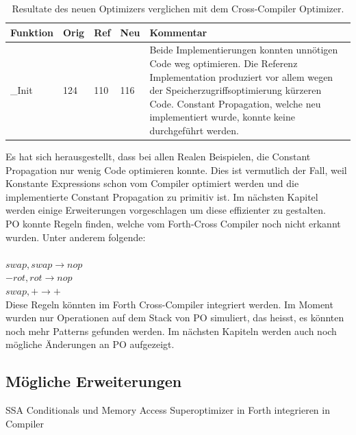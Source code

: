\begin{table}[H]
\begin{center}
    \begin{tabular}{ | l | l | l | l | p{8cm} |}
    \hline
    \textbf{Funktion} & \textbf{Orig} & \textbf{Ref} & \textbf{Neu} & \textbf{Kommentar} \\ \hline
    \_Init & 124 & 110 & 116 & Beide Implementierungen konnten unnötigen Code weg optimieren. Die Referenz Implementation produziert vor allem wegen der Speicherzugriffsoptimierung kürzeren Code. Constant Propagation, welche neu implementiert wurde, konnte keine durchgeführt werden.  \\ 
    \hline
		
    \end{tabular}
		\caption{Resultate des neuen Optimizers verglichen mit dem Cross-Compiler Optimizer.}
		\label{tab:peepresults}
\end{center}
\end{table}

Es hat sich herausgestellt, dass bei allen Realen Beispielen, die Constant Propagation nur wenig Code optimieren konnte. Dies ist vermutlich der Fall, weil Konstante Expressions schon vom Compiler optimiert werden und die implementierte Constant Propagation zu primitiv ist. Im nächsten Kapitel werden einige Erweiterungen vorgeschlagen um diese effizienter zu gestalten. \\ PO konnte Regeln finden, welche vom Forth-Cross Compiler noch nicht erkannt wurden. Unter anderem folgende:\\ \\
%
$swap, swap \rightarrow nop$\\
$-rot, rot \rightarrow nop$\\
$swap, + \rightarrow +$\\
%

Diese Regeln könnten im Forth Cross-Compiler integriert werden. Im Moment wurden nur Operationen auf dem Stack von PO simuliert, das heisst, es könnten noch mehr Patterns gefunden werden. Im nächsten Kapiteln werden auch noch mögliche Änderungen an PO aufgezeigt.

\subsection{Mögliche Erweiterungen}
SSA
Conditionals und Memory Access
Superoptimizer
in Forth
integrieren in Compiler